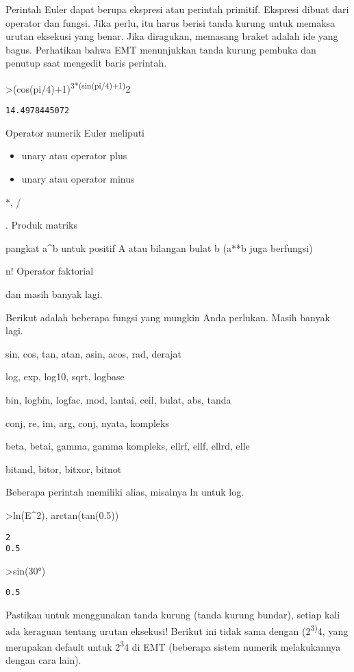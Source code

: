 \documentclass[
]{book}
\begin{document}
Perintah Euler dapat berupa ekspresi atau perintah primitif. Ekspresi dibuat dari operator dan fungsi. Jika perlu, itu harus berisi tanda kurung untuk memaksa urutan eksekusi yang benar. Jika diragukan, memasang braket adalah ide yang bagus. Perhatikan bahwa EMT menunjukkan tanda kurung pembuka dan penutup saat mengedit baris perintah.

\textgreater(cos(pi/4)+1)\textsuperscript{3*(sin(pi/4)+1)}2

\begin{verbatim}
14.4978445072
\end{verbatim}

Operator numerik Euler meliputi

\begin{itemize}
\item
  unary atau operator plus
\item
  unary atau operator minus
\end{itemize}

*, /

. Produk matriks

pangkat a\^{}b untuk positif A atau bilangan bulat b (a**b juga berfungsi)

n! Operator faktorial

dan masih banyak lagi.

Berikut adalah beberapa fungsi yang mungkin Anda perlukan. Masih banyak lagi.

sin, cos, tan, atan, asin, acos, rad, derajat

log, exp, log10, sqrt, logbase

bin, logbin, logfac, mod, lantai, ceil, bulat, abs, tanda

conj, re, im, arg, conj, nyata, kompleks

beta, betai, gamma, gamma kompleks, ellrf, ellf, ellrd, elle

bitand, bitor, bitxor, bitnot

Beberapa perintah memiliki alias, misalnya ln untuk log.

\textgreater ln(E\^{}2), arctan(tan(0.5))

\begin{verbatim}
2
0.5
\end{verbatim}

\textgreater sin(30°)

\begin{verbatim}
0.5
\end{verbatim}

Pastikan untuk menggunakan tanda kurung (tanda kurung bundar), setiap kali ada keraguan tentang urutan eksekusi! Berikut ini tidak sama dengan (2\textsuperscript{3)}4, yang merupakan default untuk 2\textsuperscript{3}4 di EMT (beberapa sistem numerik melakukannya dengan cara lain).
\end{document}
